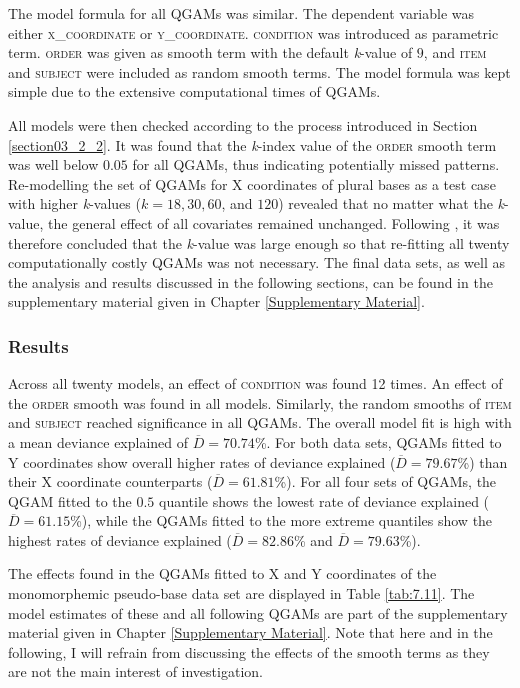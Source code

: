 The model formula for all QGAMs was similar. The dependent variable was either \textsc{x\_coordinate} or \textsc{y\_coordinate}. \textsc{condition} was introduced as parametric term. \textsc{order} was given as smooth term with the default \textit{k}-value of $9$, and \textsc{item} and \textsc{subject} were included as random smooth terms. The model formula was kept simple due to the extensive computational times of QGAMs. 

All models were then checked according to the process introduced in Section \ref{section03_2_2}. It was found that the \textit{k}-index value of the \textsc{order} smooth term was well below $0.05$ for all QGAMs, thus indicating potentially missed patterns. Re-modelling the set of QGAMs for X coordinates of plural bases as a test case with higher \textit{k}-values ($k=18,30,60$, and $120$) revealed that no matter what the \textit{k}-value, the general effect of all covariates remained unchanged. Following \citet{Wood2017}, it was therefore concluded that the \textit{k}-value was large enough so that re-fitting all twenty computationally costly QGAMs was not necessary. The final data sets, as well as the analysis and results discussed in the following sections, can be found in the supplementary material given in Chapter \ref{Supplementary Material}.

\subsubsection{Results}\label{section07_2_3_2}

Across all twenty models, an effect of \textsc{condition} was found 12 times. An effect of the \textsc{order} smooth was found in all models. Similarly, the random smooths of \textsc{item} and \textsc{subject} reached significance in all QGAMs. The overall model fit is high with a mean deviance explained of $\overline{D}=70.74$\%. For both data sets, QGAMs fitted to Y coordinates show overall higher rates of deviance explained ($\overline{D}=79.67$\%) than their X coordinate counterparts ($\overline{D}=61.81$\%). For all four sets of QGAMs, the QGAM fitted to the $0.5$ quantile shows the lowest rate of deviance explained ($\overline{D}=61.15$\%), while the QGAMs fitted to the more extreme quantiles show the highest rates of deviance explained ($\overline{D}=82.86$\% and $\overline{D}=79.63$\%).

The effects found in the QGAMs fitted to X and Y coordinates of the monomorphemic pseudo-base data set are displayed in Table \ref{tab:7.11}. The model estimates of these and all following QGAMs are part of the supplementary material given in Chapter \ref{Supplementary Material}. Note that here and in the following, I will refrain from discussing the effects of the smooth terms as they are not the main interest of investigation. 

